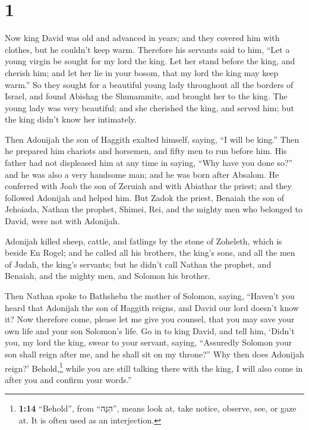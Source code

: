 \hypertarget{section}{%
\section{1}\label{section}}

 Now king David was old and advanced in years; and they
covered him with clothes, but he couldn't keep warm. 
Therefore his servants said to him, ``Let a young virgin be sought for
my lord the king. Let her stand before the king, and cherish him; and
let her lie in your bosom, that my lord the king may keep warm.''
 So they sought for a beautiful young lady throughout all
the borders of Israel, and found Abishag the Shunammite, and brought her
to the king.  The young lady was very beautiful; and she
cherished the king, and served him; but the king didn't know her
intimately.

 Then Adonijah the son of Haggith exalted himself, saying,
``I will be king.'' Then he prepared him chariots and horsemen, and
fifty men to run before him.  His father had not
displeased him at any time in saying, ``Why have you done so?'' and he
was also a very handsome man; and he was born after Absalom.
 He conferred with Joab the son of Zeruiah and with
Abiathar the priest; and they followed Adonijah and helped him.
 But Zadok the priest, Benaiah the son of Jehoiada, Nathan
the prophet, Shimei, Rei, and the mighty men who belonged to David, were
not with Adonijah.

 Adonijah killed sheep, cattle, and fatlings by the stone
of Zoheleth, which is beside En Rogel; and he called all his brothers,
the king's sons, and all the men of Judah, the king's servants;
 but he didn't call Nathan the prophet, and Benaiah, and
the mighty men, and Solomon his brother.

 Then Nathan spoke to Bathsheba the mother of Solomon,
saying, ``Haven't you heard that Adonijah the son of Haggith reigns, and
David our lord doesn't know it?  Now therefore come,
please let me give you counsel, that you may save your own life and your
son Solomon's life.  Go in to king David, and tell him,
`Didn't you, my lord the king, swear to your servant, saying,
``Assuredly Solomon your son shall reign after me, and he shall sit on
my throne?'' Why then does Adonijah reign?' 
Behold,\footnote{\textbf{1:14} ``Behold'', from ``הִנֵּה'', means look
  at, take notice, observe, see, or gaze at. It is often used as an
  interjection.} while you are still talking there with the king, I will
also come in after you and confirm your words.''

